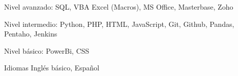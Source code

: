 


\begin{cvskills}

  \cvskill
    {Nivel avanzado:}
    {SQL, VBA Excel (Macros), MS Office, Masterbase, Zoho}

  \cvskill
    {Nivel intermedio:}
    {Python, PHP, HTML, JavaScript, Git, Github, Pandas, Pentaho, Jenkins}

  \cvskill
    {Nivel básico:}
    {PowerBi, CSS}

  \cvskill
    {Idiomas}
    {Inglés básico, Español}

\end{cvskills}
